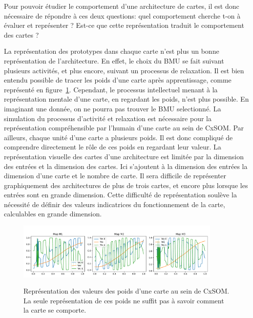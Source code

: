 Pour pouvoir étudier le comportement d'une architecture de cartes, il est donc nécessaire de répondre à ces deux questions: quel comportement cherche t-on à évaluer et représenter ? Est-ce que cette représentation traduit le comportement des cartes ?

La représentation des prototypes dans chaque carte n'est plus un bonne représentation de l'architecture.
En effet, le choix du BMU se fait suivant plusieurs activités, et plus encore, suivant un processus de relaxation. Il est bien entendu possible de tracer les poids d'une carte après apprentissage, comme représenté en figure~\ref{fig:weights}. Cependant, le processus intellectuel menant à la représentation mentale d'une carte, en regardant les poids, n'est plus possible. En imaginant une donnée, on ne pourra pas trouver le BMU selectionné. La simulation du processus d'activité et relaxation est nécessaire pour la représentation compréhensible par l'humain d'une carte au sein de CxSOM. Par ailleurs, chaque unité d'une carte a plusieurs poids. Il est donc compliqué de comprendre directement le rôle de ces poids en regardant leur valeur. La représentation visuelle des cartes d'une architecture est limitée par la dimension des entrées et la dimension des cartes. Ici s'ajoutent à la dimension des entrées la dimension d'une carte et le nombre de carte. Il sera difficile de représenter graphiquement des architectures de plus de trois cartes, et encore plus lorsque les entrées sont en grande dimension. Cette difficulté de représentation soulève la nécessité de définir des valeurs indicatrices du fonctionnement de la carte, calculables en grande dimension.

\begin{figure}
\centering
\includegraphics[width=0.9\textwidth]{weights.pdf}
\label{fig:weights}
\caption{Représentation des valeurs des poids d'une carte au sein de CxSOM. La seule représentation de ces poids ne suffit pas à savoir comment la carte se comporte. }
\end{figure}


